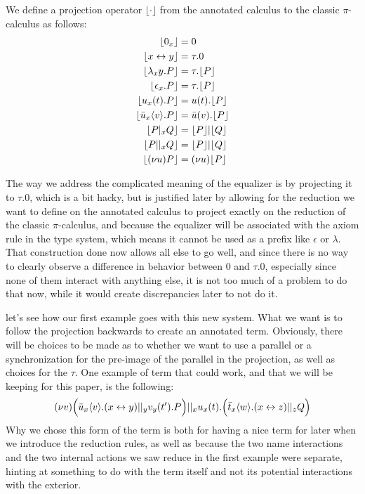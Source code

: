 \begin{definition}
We define a projection operator $\lfloor\cdot\rfloor$ from the annotated calculus to the classic $\pi$-calculus as follows:\\
\begin{align*}
\lfloor 0_x \rfloor &= 0 \\
\lfloor x \leftrightarrow y \rfloor &= \tau.0 \\
\lfloor \lambda_xy.P \rfloor &= \tau.\lfloor P \rfloor \\
\lfloor \epsilon_x.P \rfloor &= \tau.\lfloor P \rfloor \\
\lfloor u_x(t).P \rfloor &= u(t).\lfloor P \rfloor \\
\lfloor \bar{u}_x\langle v\rangle.P \rfloor &= \bar{u}(v).\lfloor P \rfloor \\
\lfloor P |_x Q \rfloor &= \lfloor P \rfloor | \lfloor Q \rfloor \\
\lfloor P ||_x Q \rfloor &= \lfloor P \rfloor | \lfloor Q \rfloor \\
\lfloor (\nu u)P \rfloor &= (\nu u)\lfloor P \rfloor
\end{align*}
\end{definition}

\remark The way we address the complicated meaning of the equalizer is by projecting it to $\tau.0$, which is a bit hacky, but is justified later by allowing for the reduction we want to define on the annotated calculus to project exactly on the reduction of the classic $\pi$-calculus, and because the equalizer will be associated with the axiom rule in the type system, which means it cannot be used as a prefix like $\epsilon$ or $\lambda$. That construction done now allows all else to go well, and since there is no way to clearly observe a difference in behavior between $0$ and $\tau.0$, especially since none of them interact with anything else, it is not too much of a problem to do that now, while it would create discrepancies later to not do it.

\example let's see how our first example goes with this new system. What we want is to follow the projection backwards to create an annotated term. Obviously, there will be choices to be made as to whether we want to use a parallel or a synchronization for the pre-image of the parallel in the projection, as well as choices for the $\tau$. One example of term that could work, and that we will be keeping for this paper, is the following:
\[(\nu v)\Bigl(\bar{u}_x\langle v\rangle.(x\leftrightarrow y) ||_y v_y(t').P\Bigr) ||_x u_x(t).\Bigl(\bar{t}_x\langle w\rangle.(x\leftrightarrow z) ||_z Q\Bigr)\]
Why we chose this form of the term is both for having a nice term for later when we introduce the reduction rules, as well as because the two name interactions and the two internal actions we saw reduce in the first example were separate, hinting at something to do with the term itself and not its potential interactions with the exterior.